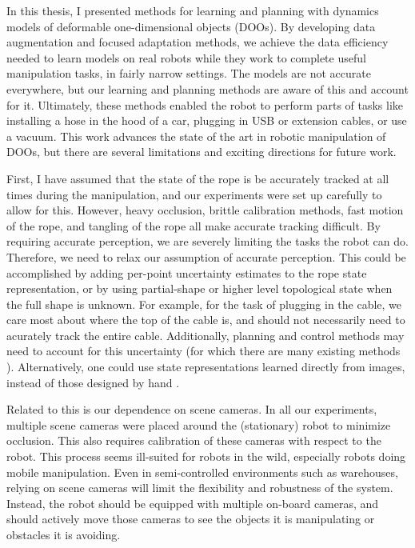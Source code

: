 In this thesis, I presented methods for learning and planning with dynamics models of deformable one-dimensional objects (DOOs). By developing data augmentation and focused adaptation methods, we achieve the data efficiency needed to learn models on real robots while they work to complete useful manipulation tasks, in fairly narrow settings. The models are not accurate everywhere, but our learning and planning methods are aware of this and account for it. Ultimately, these methods enabled the robot to perform parts of tasks like installing a hose in the hood of a car, plugging in USB or extension cables, or use a vacuum. This work advances the state of the art in robotic manipulation of DOOs, but there are several limitations and exciting directions for future work.

First, I have assumed that the state of the rope is be accurately tracked at all times during the manipulation, and our experiments were set up carefully to allow for this. However, heavy occlusion, brittle calibration methods, fast motion of the rope, and tangling of the rope all make accurate tracking difficult. By requiring accurate perception, we are severely limiting the tasks the robot can do. Therefore, we need to relax our assumption of accurate perception. This could be accomplished by adding per-point uncertainty estimates to the rope state representation, or by using partial-shape or higher level topological state when the full shape is unknown. For example, for the task of plugging in the cable, we care most about where the top of the cable is, and should not necessarily need to acurately track the entire cable. Additionally, planning and control methods may need to account for this uncertainty (for which there are many existing methods \cite{platt2010belief, FIRM, LQGMP}). Alternatively, one could use state representations learned directly from images, instead of those designed by hand \cite{Hafner2019}.

Related to this is our dependence on scene cameras. In all our experiments, multiple scene cameras were placed around the (stationary) robot to minimize occlusion. This also requires calibration of these cameras with respect to the robot. This process seems ill-suited for robots in the wild, especially robots doing mobile manipulation. Even in semi-controlled environments such as warehouses, relying on scene cameras will limit the flexibility and robustness of the system. Instead, the robot should be equipped with multiple on-board cameras, and should actively move those cameras to see the objects it is manipulating or obstacles it is avoiding.

